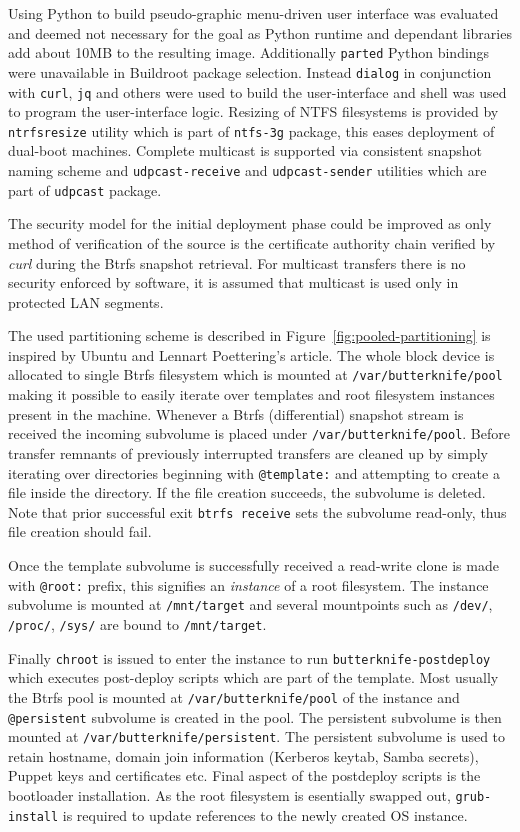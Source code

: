 \documentclass[a4paper,11pt]{kth-mag}
\begin{document}
Using Python to build pseudo-graphic menu-driven user interface was
evaluated and deemed not necessary for the goal as Python runtime and
dependant libraries add about 10MB to the resulting image.
Additionally \texttt{parted} Python bindings were unavailable
in Buildroot package selection.
Instead \texttt{dialog} in conjunction with
\texttt{curl}, \texttt{jq} and others were used to build the user-interface
and shell was used to program the user-interface logic.
Resizing of NTFS filesystems is provided by \texttt{ntrfsresize} utility
which is part of \texttt{ntfs-3g} package, this eases deployment of
dual-boot machines.
Complete multicast is supported via consistent snapshot naming scheme
and \texttt{udpcast-receive} and \texttt{udpcast-sender} utilities which
are part of \texttt{udpcast} package.

The security model for the initial deployment phase could be improved
as only method of verification of the source is the certificate
authority chain verified by \emph{curl} during the Btrfs snapshot
retrieval. For multicast transfers there is no security
enforced by software, it is assumed that multicast is used only
in protected LAN segments.

The used partitioning scheme is described in Figure~\ref{fig:pooled-partitioning}
is inspired by Ubuntu and Lennart Poettering's article.
\cite{revisiting-how-we-put-together-linux-systems}
The whole block device is allocated to single Btrfs filesystem
which is mounted at \texttt{/var/butterknife/pool} making
it possible to easily iterate over templates and root filesystem instances
present in the machine.
Whenever a Btrfs (differential) snapshot stream is received
the incoming subvolume is placed under \texttt{/var/butterknife/pool}.
Before transfer remnants of previously interrupted transfers are cleaned
up by simply iterating over directories beginning with \texttt{@template:}
and attempting to create a file inside the directory.
If the file creation succeeds, the subvolume is deleted.
Note that prior successful exit \texttt{btrfs receive} sets the
subvolume read-only, thus file creation should fail.

Once the template subvolume is successfully received
a read-write clone is made with \texttt{@root:} prefix,
this signifies an \emph{instance} of a root filesystem.
The instance subvolume is mounted at \texttt{/mnt/target}
and several mountpoints such as \texttt{/dev/},
\texttt{/proc/}, \texttt{/sys/} are bound to \texttt{/mnt/target}.

Finally \texttt{chroot} is issued to enter the instance to
run \texttt{butterknife-postdeploy} which executes
post-deploy scripts which are part of the template.
Most usually the Btrfs pool is mounted at \texttt{/var/butterknife/pool}
of the instance and \texttt{@persistent} subvolume is created
in the pool.
The persistent subvolume is then mounted at \texttt{/var/butterknife/persistent}.
The persistent subvolume is used to retain hostname,
domain join information (Kerberos keytab, Samba secrets),
Puppet keys and certificates etc.
Final aspect of the postdeploy scripts is the 
bootloader installation.
As the root filesystem is esentially swapped out,
\texttt{grub-install} is required to update references
to the newly created OS instance.
\end{document}
